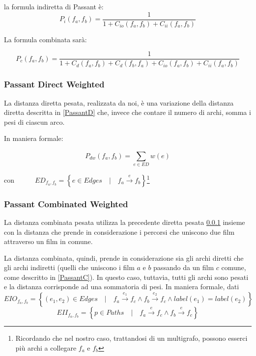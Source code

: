 la formula indiretta di Passant è:
    \begin{equation}
        P_i(f_{a},f_{b}) = \frac{1} {1+C_{io}(f_{a},f_{b})+C_{ii}(f_{a},f_{b})}
    \end{equation}

La formula combinata sarà:

    \begin{equation}
P_{c}(f_{a},f_{b}) = \frac{1} {1+C_{d}(f_{a},f_{b})+C_{d}(f_{b},f_{a})+C_{io}(f_{a},f_{b})+C_{ii}(f_{a},f_{b})}
    \end{equation}


\subsubsection{Passant Direct Weighted}
\label{PassantDW}
La distanza diretta pesata, realizzata da noi, è una variazione della distanza diretta descritta in \ref{PassantD} che, invece che contare il numero di archi, somma i pesi di ciascun arco.

In maniera formale:

\begin{equation}
P_{dw}(f_a,f_b) = \sum\limits_{e \in ED}^{}{w(e)}
\end{equation}

con~~$ \qquad ED_{f_a,f_b} = \left\{ e \in Edges \quad\big\vert\quad f_a \xrightarrow{~e~} f_b \right\}$\footnote{Ricordando che nel nostro caso, trattandosi di un multigrafo, possono esserci più archi a collegare $f_a$ e $f_b$}

\subsubsection{Passant Combinated Weighted}
La distanza combinata pesata utilizza la precedente diretta pesata
\ref{PassantDW} insieme con la distanza che prende in considerazione i percorsi che uniscono due film attraverso un film in comune.

La distanza combinata, quindi, prende in considerazione sia gli archi diretti che gli archi indiretti (quelli che uniscono i film $a$ e $b$ passando da un film $c$ comune, come descritto in \ref{PassantC}). In questo caso, tuttavia, tutti gli archi sono pesati e la distanza corrisponde ad una sommatoria di pesi. In maniera formale, dati
$$EIO_{f_a,f_b} = \left\{ (e_1, e_2) \in Edges \quad\big\vert\quad f_a \xrightarrow{e_1} f_c \wedge f_b \xrightarrow{e_2} f_c \wedge label(e_1)=label(e_2) \right\}$$
$$EII_{f_a,f_b} = \left\{ p \in Paths \quad\big\vert\quad f_a \xrightarrow{e} f_c \wedge f_b \xrightarrow{e} f_c \right\}$$

